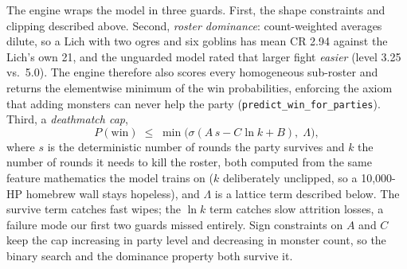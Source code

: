 \documentclass[10pt]{article}
\newcommand{\code}[1]{\texttt{\small #1}}
\begin{document}
The engine wraps the model in three guards. First, the shape constraints and
clipping described above. Second, \emph{roster
dominance}: count-weighted averages dilute, so a Lich with two ogres and six
goblins has mean CR 2.94 against the Lich's own 21, and the unguarded model rated
that larger fight \emph{easier} (level 3.25 vs.\ 5.0). The engine therefore also
scores every homogeneous sub-roster and returns the elementwise minimum of the win
probabilities, enforcing the axiom that adding monsters can never help the party
(\code{predict\_win\_for\_parties}). Third, a \emph{deathmatch cap},
\[
P(\text{win}) \;\le\; \min\!\big(\sigma(A\, s - C \ln k + B),\; \Lambda\big),
\]
where $s$ is the deterministic number of rounds the party survives and $k$ the
number of rounds it needs to kill the roster, both computed from the same feature
mathematics the model trains on ($k$ deliberately unclipped, so a 10{,}000-HP
homebrew wall stays hopeless), and $\Lambda$ is a lattice term described below.
The survive term catches fast wipes; the $\ln k$ term catches slow attrition
losses, a failure mode our first two guards missed entirely. Sign constraints on
$A$ and $C$ keep the cap increasing in party level and decreasing in monster
count, so the binary search and the dominance property both survive it.
\end{document}
